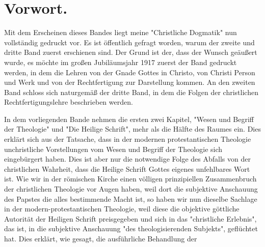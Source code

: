 \section*{Vorwort.}

Mit dem Erscheinen dieses Bandes liegt meine "Christliche Dogmatik" nun vollständig gedruckt vor. Es ist öffentlich gefragt worden, warum der zweite und dritte Band zuerst erschienen sind. Der Grund ist der, dass der Wunsch geäußert wurde, es möchte im großen Jubiläumsjahr 1917 zuerst der Band gedruckt werden, in dem die Lehren von der Gnade Gottes in Christo, von Christi Person und Werk und von der Rechtfertigung zur Darstellung kommen. An den zweiten Band schloss sich naturgemäß der dritte Band, in dem die Folgen der christlichen Rechtfertigungslehre beschrieben werden.

In dem vorliegenden Bande nehmen die ersten zwei Kapitel, "Wesen und Begriff der Theologie" und "Die Heilige Schrift", mehr als die Hälfte des Raumes ein. Dies erklärt sich aus der Tatsache, dass in der modernen protestantischen Theologie unchristliche Vorstellungen vom Wesen und Begriff der Theologie sich eingebürgert haben. Dies ist aber nur die notwendige Folge des Abfalls von der christlichen Wahrheit, dass die Heilige Schrift Gottes eigenes unfehlbares Wort ist. Wie wir in der römischen Kirche einen völligen prinzipiellen Zusammenbruch der christlichen Theologie vor Augen haben, weil dort die subjektive Anschauung des Papstes die alles bestimmende Macht ist, so haben wir nun dieselbe Sachlage in der modern-protestantischen Theologie, weil diese die objektive göttliche Autorität der Heiligen Schrift preisgegeben und sich in das "christliche Erlebnis", das ist, in die subjektive Anschauung "des theologisierenden Subjekts", geflüchtet hat. Dies erklärt, wie gesagt, die ausführliche Behandlung der